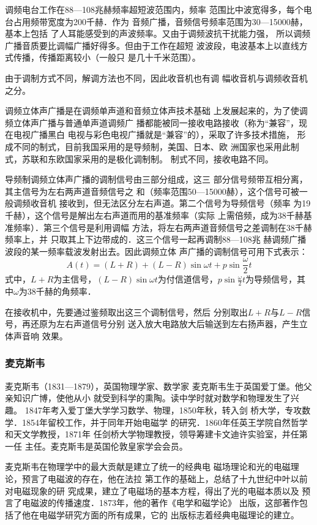 调频电台工作在88—108兆赫频率超短波范围内，频率
范围比中波宽得多，每个电台占用频带宽度为200千赫．作为
音频广播，音频信号频率范围为30—15000赫，基本上包括
了人耳能感受到的声波频率。又由于调频波抗干扰能力强，
所以调频广播音质要比调幅广播好得多。但由于工作在超短
波波段，电波基本上以直线方式传播，传播距离较小（一般只
是几十千米范围）。

由于调制方式不同，解调方法也不同，因此收音机也有调
幅收音机与调频收音机之分。

调频立体声广播是在调频单声道和音频立体声技术基础
上发展起来的，为了使调频立体声广播与普通单声道调频广
播都能被同一接收电路接收（称为“兼容”，现在电视广播黑白
电视与彩色电视广播就是“兼容”的），采取了许多技术措施，
形成不同的制式，目前我国采用的是导频制，美国、日本、欧
洲国家也采用此制式，苏联和东欧国家采用的是极化调制制。
制式不同，接收电路不同。

导频制调频立体声广播的调制信号由三部分组成，这三
部分信号频带互相分离，其主信号为左右两声道音频信号之
和（频率范围50—15000赫），这个信号可被一般调频收音机
接收到，但无法区分左右声道。第二个信号为导频信号（频率
为19千赫），这个信号是解出左右声道而用的基准频率（实际
上需倍频，成为38千赫基准频率）．第三个信号是利用调幅
方法，将左右两声道音频信号之差调制在38千赫频率上，并
只取其上下边带成的．这三个信号一起再调制88—108兆
赫调频广播波段的某一频率载波发射出去。因此调频立体
声广播的调制信号可用下式表示：
\[A(t)=(L+R)+(L-R)\sin\omega t+p\sin\frac{\omega}{2}
t\]
式中，$L+R$为主信号，$(L-R)\sin\omega t$为付信道信号，$p\sin\frac{\omega}{2}t$为导频信号，其中$\omega$为38千赫的角频率．

在接收机中，先要通过鉴频取出这三个调制信号，然后
分别取出$L+R$与$L-R$信号，再还原为左右声道信号分别
送入放大电路放大后输送到左右扬声器，产生立体声音响
效果。

\subsubsection{麦克斯韦}

麦克斯韦（1831—1879），英国物理学家、数学家
麦克斯韦生于英国爱丁堡。他父亲知识广博，使他从小
就受到科学的熏陶。读中学时就对数学和物理发生了兴趣。
1847年考入爱丁堡大学学习数学、物理，1850年秋，转入剑
桥大学，专攻数学．1854年留校工作，并于同年开始电磁学
的研究．1860年任英王学院自然哲学和天文学教授，1871年
任剑桥大学物理教授，领导筹建卡文迪许实验室，并任第一任
主任。麦克斯韦是英国伦敦皇家学会会员。

麦克斯韦在物理学中的最大贡献是建立了统一的经典电
磁场理论和光的电磁理论，预言了电磁波的存在，他在法拉
第工作的基础上，总结了十九世纪中叶以前对电磁现象的研
究成果，建立了电磁场的基本方程，得出了光的电磁本质以及
预言了电磁波的传播速度．1873年，他的著作《电学和磁学论》
出版，这部著作包括了他在电磁学研究方面的所有成果，它的
出版标志着经典电磁理论的建立。

